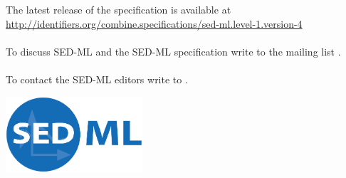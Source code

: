 \begin{titlepage}
\begin{center}
\normalsize
\begin{minipage}{5in}
\begin{center}
  The latest release of the \currentLV specification is available at
  \url{http://identifiers.org/combine.specifications/sed-ml.level-1.version-4}
  \paragraph*{}
  To discuss SED-ML and the SED-ML specification write to the mailing list .

  \paragraph*{}
  To contact the SED-ML editors write to .
\end{center}
\end{minipage}
\vfill


\centerline{\includegraphics[width=2in]{images/logoSedml.png}}

\end{center}

\end{titlepage}

%
%

\setcounter{page}{2}



